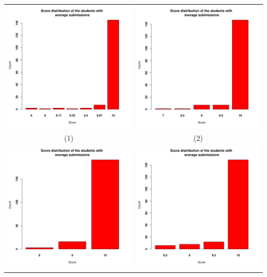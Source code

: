 \documentclass[a4paper]{article}
\theoremstyle{definition}
\begin{document}
\begin{enumerate}[a)]
\begin{itemize}
\begin{center}
\begin{tabular}{c c}
                 \includegraphics[width = 6.9cm]{Images/img3-3-1.png} & \includegraphics[width = 6.9cm]{Images/img3-3-2.png} \\
                 (1) & (2) \\
                 \includegraphics[width = 6.9cm]{Images/img3-3-3.png} &
                 \includegraphics[width = 6.9cm]{Images/img3-3-4.png} \\

\end{tabular}
\end{center}
\end{itemize}
\end{enumerate}
\end{document}
